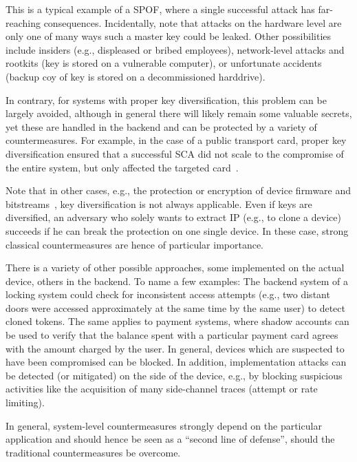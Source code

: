 This is a typical example of a \ac{SPOF}, where a single successful attack has far-reaching consequences. Incidentally, note that attacks on the hardware level are only one of many ways such a master key could be leaked. Other possibilities include insiders (e.g., displeased or bribed employees), network-level attacks and rootkits (key is stored on a vulnerable computer), or unfortunate accidents (backup coy of key is stored on a decommissioned harddrive).

In contrary, for systems with proper key diversification, this problem can be largely avoided, although in general there will likely remain some valuable secrets, yet these are handled in the backend and can be protected by a variety of countermeasures. For example, in the case of a public transport card, proper key diversification ensured that a successful \ac{SCA} did not scale to the compromise of the entire system, but only affected the targeted card~\cite{OswaldPhD13}.

Note that in other cases, e.g., the protection or encryption of device firmware and bitstreams~\cite{Moradi13,Strobel15,Swierczynski14,actelSca,SCAV4V5}, key diversification is not always applicable. Even if keys are diversified, an adversary who solely wants to extract \ac{IP} (e.g., to clone a device) succeeds if he can break the protection on one single device. In these case, strong classical countermeasures are hence of particular importance.

There is a variety of other possible approaches, some implemented on the actual device, others in the backend. To name a few examples: The backend system of a locking system could check for inconsistent access attempts (e.g., two distant doors were accessed approximately at the same time by the same user) to detect cloned tokens. The same applies to payment systems, where shadow accounts can be used to verify that the balance spent with a particular payment card agrees with the  amount charged by the user. In general, devices which are suspected to have been compromised can be blocked. 
In addition, implementation attacks can be detected (or mitigated) on the side of the device, e.g., by blocking suspicious activities like the acquisition of many side-channel traces (attempt or rate limiting). 

In general, system-level countermeasures strongly depend on the particular application and should hence be seen as a ``second line of defense'', should the traditional countermeasures be overcome.





